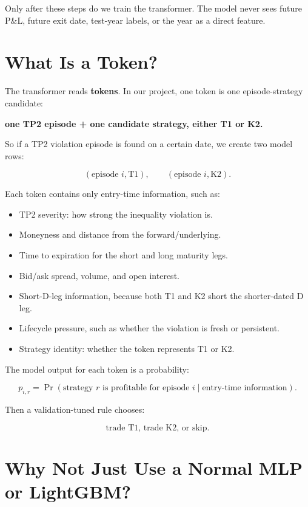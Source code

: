 \documentclass[11pt]{article}
\newcommand{\1}{\mathbf{1}}
\begin{document}
Only after these steps do we train the transformer. The model never sees future
P\&L, future exit date, test-year labels, or the year as a direct feature.

\section{What Is a Token?}

The transformer reads \textbf{tokens}. In our project, one token is one
episode-strategy candidate:

\begin{center}
\textbf{one TP2 episode + one candidate strategy, either T1 or K2.}
\end{center}

So if a TP2 violation episode is found on a certain date, we create two model
rows:

\[
  (\text{episode } i, \text{T1}), \qquad
  (\text{episode } i, \text{K2}).
\]

Each token contains only entry-time information, such as:

\begin{itemize}[leftmargin=*]
  \item TP2 severity: how strong the inequality violation is.
  \item Moneyness and distance from the forward/underlying.
  \item Time to expiration for the short and long maturity legs.
  \item Bid/ask spread, volume, and open interest.
  \item Short-D-leg information, because both T1 and K2 short the shorter-dated
        D leg.
  \item Lifecycle pressure, such as whether the violation is fresh or persistent.
  \item Strategy identity: whether the token represents T1 or K2.
\end{itemize}

The model output for each token is a probability:

\[
  p_{i,r} =
  \Pr(\text{strategy } r \text{ is profitable for episode } i
  \mid \text{entry-time information}).
\]

Then a validation-tuned rule chooses:

\[
  \text{trade T1, trade K2, or skip.}
\]

\section{Why Not Just Use a Normal MLP or LightGBM?}
\end{document}
